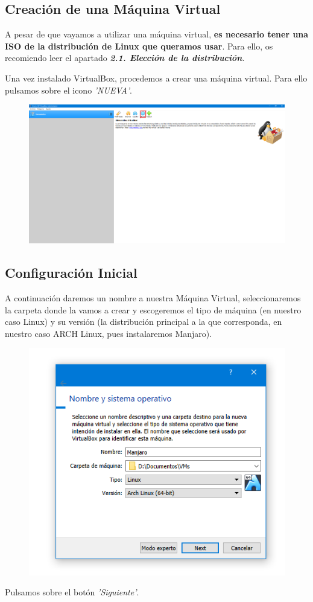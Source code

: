 \subsection{Creación de una Máquina Virtual}
\noindent
A pesar de que vayamos a utilizar una máquina virtual, \textbf{es necesario tener una ISO de la distribución de Linux que queramos usar}.
\noindent
\newline Para ello, os recomiendo leer el apartado \textbf{\textit{2.1. Elección de la distribución}}.

\noindent
\newline Una vez instalado VirtualBox, procedemos a crear una máquina virtual.
\newline Para ello pulsamos sobre el icono \textit{'NUEVA'}.
    \begin{figure}[H]
        \centering
        \includegraphics[width= 0.7 \textwidth]{Media/VB1.png}
    \end{figure}
    
\subsection{Configuración Inicial}
\noindent
A continuación daremos un nombre a nuestra Máquina Virtual, seleccionaremos la carpeta donde la vamos a crear y escogeremos el tipo de máquina (en nuestro caso Linux) y su versión (la distribución principal a la que corresponda, en nuestro caso ARCH Linux, pues instalaremos Manjaro).
    \begin{figure}[H]
        \centering
        \includegraphics[width= 0.7 \textwidth]{Media/VB2.png}
    \end{figure}
\newline \noindent Pulsamos sobre el botón \textit{'Siguiente'}.

